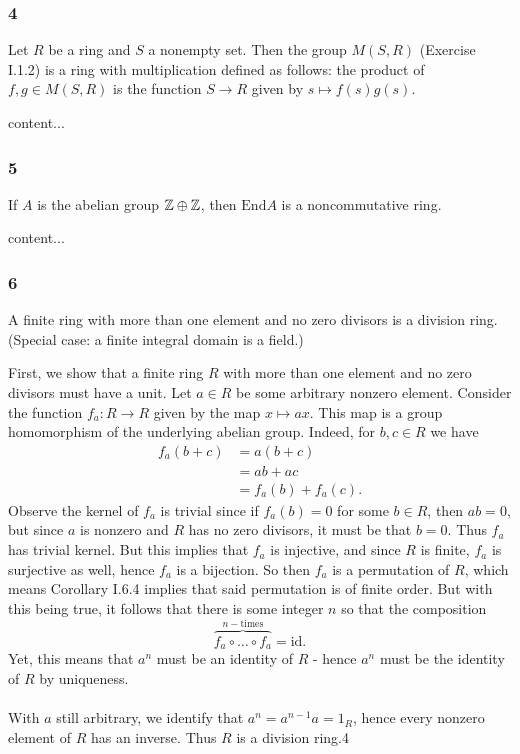 \subsubsection*{4}
\begin{graybox}
	Let $R$ be a ring and $S$ a nonempty set. Then the group $M(S,R)$ (Exercise I.1.2) is a ring with multiplication defined as follows: the product of $f, g \in M(S,R)$ is the function $S \to R$ given by $s \mapsto f(s)g(s)$.
\end{graybox}
\begin{solution}
	content...
\end{solution}

\subsubsection*{5}
\begin{graybox}
	If $A$ is the abelian group $\mathbb{Z} \oplus \mathbb{Z}$, then $\text{End} A$ is a noncommutative ring.
\end{graybox}
\begin{solution}
	content...
\end{solution}

\subsubsection*{6}
\begin{graybox}
	A finite ring with more than one element and no zero divisors is a division ring. (Special case: a finite integral domain is a field.)
\end{graybox}
\begin{solution}
	First, we show that a finite ring $R$ with more than one element and no zero divisors must have a unit. Let $a \in R$ be some arbitrary nonzero element. Consider the function $f_a : R \to R$ given by the map $x \mapsto ax$. This map is a group homomorphism of the underlying abelian group. Indeed, for $b,c \in R$ we have
	\begin{align*}
		f_a(b + c) &= a(b + c)\\
		&= ab + ac\\
		&= f_a(b) + f_a(c).
	\end{align*}
	Observe the kernel of $f_a$ is trivial since if $f_a(b) = 0$ for some $b \in R$, then $ab = 0$, but since $a$ is nonzero and $R$ has no zero divisors, it must be that $b = 0$. Thus $f_a$ has trivial kernel. But this implies that $f_a$ is injective, and since $R$ is finite, $f_a$ is surjective as well, hence $f_a$ is a bijection. So then $f_a$ is a permutation of $R$, which means Corollary I.6.4 implies that said permutation is of finite order. But with this being true, it follows that there is some integer $n$ so that the composition
	$$
		\overbrace{f_a \circ \dots \circ f_a}^{n-\text{times}} = \text{id}.
	$$
	Yet, this means that $a^n$ must be an identity of $R$ - hence $a^n$ must be the identity of $R$ by uniqueness.\\
	\\
	With $a$ still arbitrary, we identify that $a^n = a^{n-1}a = 1_R$, hence every nonzero element of $R$ has an inverse. Thus $R$ is a division ring.4
\end{solution}


